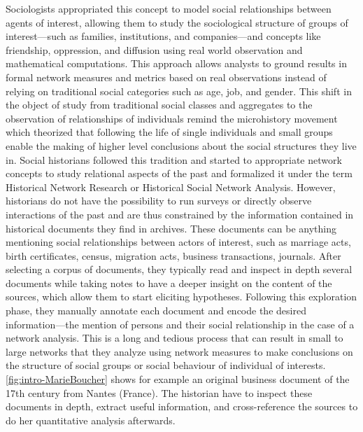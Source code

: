 Sociologists appropriated this concept to model social relationships between agents of interest, allowing them to study the sociological structure of groups of interest---such as families, institutions, and companies---and concepts like friendship, oppression, and diffusion using real world observation and mathematical computations.
This \sna approach allows analysts to ground results in formal network measures and metrics based on real observations instead of relying on traditional social categories such as age, job, and gender\cite{freemanDevelopmentSocialNetwork2004}.
This shift in the object of study from traditional social classes and aggregates to the observation of relationships of individuals remind the microhistory movement\cite{ginzburgMicrohistoire1981} which theorized that following the life of single individuals and small groups enable the making of higher level conclusions about the social structures they live in.
Social historians followed this tradition and started to appropriate network concepts to study relational aspects of the past and formalized it under the term Historical Network Research or Historical Social Network Analysis\cite{wetherellHistoricalSocialNetwork1998}.
However, historians do not have the possibility to run surveys or directly observe interactions of the past and are thus constrained by the information contained in historical documents they find in archives.
These documents can be anything mentioning social relationships between actors of interest, such as marriage acts, birth certificates, census, migration acts, business transactions, journals.
After selecting a corpus of documents, they typically read and inspect in depth several documents while taking notes to have a deeper insight on the content of the sources, which allow them to start eliciting hypotheses.
Following this exploration phase, they manually annotate each document and encode the desired information---the mention of persons and their social relationship in the case of a network analysis.
This is a long and tedious process that can result in small to large networks that they analyze using network measures to make conclusions on the structure of social groups or social behaviour of individual of interests.
\autoref{fig:intro-MarieBoucher} shows for example an original business document of the 17th century from Nantes (France).
The historian have to inspect these documents in depth, extract useful information, and cross-reference the sources to do her quantitative analysis afterwards.

